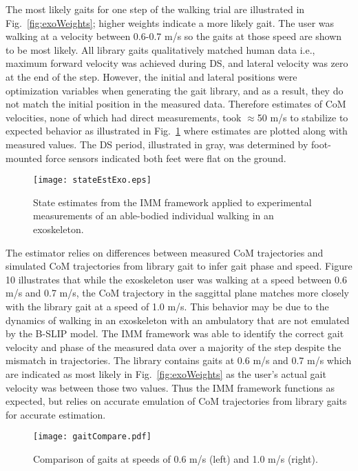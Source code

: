 The most likely gaits for one step of the walking trial are illustrated in Fig.~\ref{fig:exoWeights}; higher weights indicate a more likely gait. The user was walking at a velocity between 0.6-0.7 m/s so the gaits at those speed are shown to be most likely. All library gaits qualitatively matched human data i.e., maximum forward velocity was achieved during DS, and lateral velocity was zero at the end of the step. However, the initial and lateral positions were optimization variables when generating the gait library, and as a result, they do not match the initial position in the measured data. Therefore estimates of CoM velocities, none of which had direct measurements, took $ \approx $50 m/s to stabilize to expected behavior as illustrated in Fig.~\ref{fig:exoState} where estimates are plotted along with measured values. The DS period, illustrated in gray, was determined by foot-mounted force sensors indicated both feet were flat on the ground.
\begin{figure}
	\centering
	\texttt{[image: stateEstExo.eps]}
	\caption{State estimates from the IMM framework applied to experimental measurements of an able-bodied individual walking in an exoskeleton.}\label{fig:exoState}
\end{figure}

The estimator relies on differences between measured CoM trajectories and simulated CoM trajectories from library gait to infer gait phase and speed. Figure 10 illustrates that while the exoskeleton user was walking at a speed between 0.6 m/s and 0.7 m/s, the CoM trajectory in the saggittal plane matches more closely with the library gait at a speed of 1.0 m/s. This behavior may be due to the dynamics of walking in an exoskeleton with an ambulatory that are not emulated by the B-SLIP model. The IMM framework was able to identify the correct gait velocity and phase of the measured data over a majority of the step despite the mismatch in trajectories. The library contains gaits at 0.6 m/s and 0.7 m/s which are indicated as most likely in Fig.~\ref{fig:exoWeights} as the user's actual gait velocity was between those two values. Thus the IMM framework functions as expected, but relies on accurate emulation of CoM trajectories from library gaits for accurate estimation.

\begin{figure}
	\centering
	\texttt{[image: gaitCompare.pdf]}
	\caption{Comparison of gaits at speeds of 0.6 m/s  (left) and 1.0 m/s  (right).}\label{fig:compare}
\end{figure}